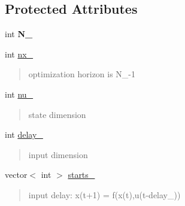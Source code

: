 \subsection*{Protected Attributes}
\begin{DoxyCompactItemize}
\item 
\mbox{\label{classModel_aa6c6273a32932807a0493a4bbbddc3ac}} 
int {\bfseries N\+\_\+}
\item 
\mbox{\label{classModel_aa6366c28ab7954d88654d8068e6d2fcf}} 
int \mbox{\hyperlink{classModel_aa6366c28ab7954d88654d8068e6d2fcf}{nx\+\_\+}}
\begin{DoxyCompactList}\small\item\em \begin{quote}
optimization horizon is N\+\_\+-\/1\end{quote}
\end{DoxyCompactList}\item 
\mbox{\label{classModel_a15ec07a022d857863dcde067d0103aa5}} 
int \mbox{\hyperlink{classModel_a15ec07a022d857863dcde067d0103aa5}{nu\+\_\+}}
\begin{DoxyCompactList}\small\item\em \begin{quote}
state dimension\end{quote}
\end{DoxyCompactList}\item 
\mbox{\label{classModel_aac68536265db5eab9bb3967db61c8f70}} 
int \mbox{\hyperlink{classModel_aac68536265db5eab9bb3967db61c8f70}{delay\+\_\+}}
\begin{DoxyCompactList}\small\item\em \begin{quote}
input dimension\end{quote}
\end{DoxyCompactList}\item 
\mbox{\label{classModel_a9ae228c1b5463523cf3f3a844ec7ffc5}} 
vector$<$ int $>$ \mbox{\hyperlink{classModel_a9ae228c1b5463523cf3f3a844ec7ffc5}{starts\+\_\+}}
\begin{DoxyCompactList}\small\item\em \begin{quote}
input delay\+: x(t+1) = f(x(t),u(t-\/delay\+\_\+))\end{quote}
\end{DoxyCompactList}\end{DoxyCompactItemize}



